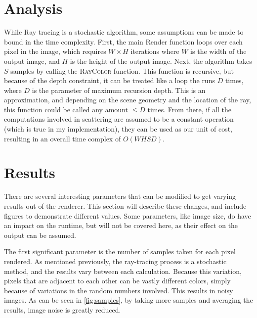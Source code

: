 \documentclass[10pt]{IEEEtran}
\begin{document}
\section*{Analysis}

While Ray tracing is a stochastic algorithm, some assumptions can be made to bound in the time
complexity. First, the main Render function loops over each pixel in the image, which requires
$W\times H$ iterations where $W$ is the width of the output image, and $H$ is the height of the
output image. Next, the algorithm takes $S$ samples by calling the \textsc{RayColor} function. This
function is recursive, but because of the depth constraint, it can be treated like a loop the runs
$D$ times, where $D$ is the parameter of maximum recursion depth. This is an approximation, and
depending on the scene geometry and the location of the ray, this function could be called any
amount $\le D$ times. From there, if all the computations involved in scattering are assumed to be a
constant operation (which is true in my implementation), they can be used as our unit of cost,
resulting in an overall time complex of $O(WHSD)$.

\section*{Results}

There are several interesting parameters that can be modified to get varying results out of the
renderer. This section will describe these changes, and include figures to demonstrate different
values. Some parameters, like image size, do have an impact on the runtime, but will not be covered
here, as their effect on the output can be assumed.

The first significant parameter is the number of samples taken for each pixel rendered. As mentioned
previously, the ray-tracing process is a stochastic method, and the results vary between each
calculation. Because this variation, pixels that are adjacent to each other can be vastly different
colors, simply because of variations in the random numbers involved. This results in noisy images.
As can be seen in \cref{fig:samples}, by taking more samples and averaging the results, image noise
is greatly reduced.
\end{document}

